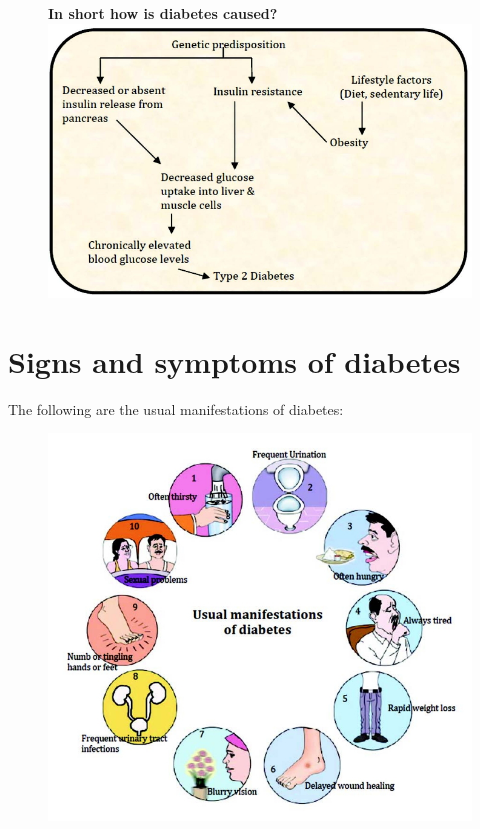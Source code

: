 \clearpage

\textbf{}
\begin{figure}[h]
\centering
\textbf{In short how is diabetes caused?}\\
\includegraphics[scale=2.6]{images/022.jpg}
\end{figure}


\chapter{Signs and symptoms of diabetes}\label{chap4}

The following are the usual manifestations of diabetes:

\begin{figure}[h]
\centering
\includegraphics[scale=2.3]{images/023.jpg}
\end{figure}

